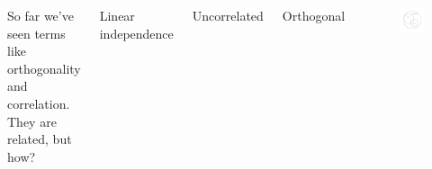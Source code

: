 \documentclass{beamer}
\begin{document}
\begin{frame}
\begin{columns}[c]
So far we've seen terms like orthogonality and correlation. They are related, but how?
\begin{block}{}
Linear independence
\end{block}

\begin{block}{}
Uncorrelated
\end{block}

\begin{block}{}
Orthogonal
\end{block}
\begin{figure}[t]
\begin{center}
 \includegraphics[width=1.3\textwidth]{relation_venn_stats_a}
\caption{}
\end{center}
\end{figure}
\end{columns}
\end{frame}
\end{document}
